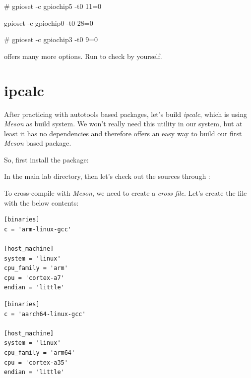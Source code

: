 \if{}
\begin{bashinput}
# gpioset -c gpiochip5 -t0 11=0
\end{bashinput}
\fi

\if{}
\begin{bashinput}
gpioset -c gpiochip0 -t0 28=0
\end{bashinput}
\fi

\if{}
\begin{bashinput}
# gpioset -c gpiochip3 -t0 9=0
\end{bashinput}
\fi

 offers many more options. Run  to
check by yourself.

\section{ipcalc}

After practicing with autotools based packages, let's build {\em ipcalc}, which
is using {\em Meson} as build system. We won't really need this utility
in our system, but at least it has no dependencies and therefore
offers an easy way to build our first {\em Meson} based package.

So, first install the  package:


In the main lab directory, then let's check out the sources through
:


To cross-compile with {\em Meson}, we need to create a {\em cross file}.
Let's create the  file with the below contents:

\if{}
\begin{verbatim}
[binaries]
c = 'arm-linux-gcc'

[host_machine]
system = 'linux'
cpu_family = 'arm'
cpu = 'cortex-a7'
endian = 'little'
\end{verbatim}
\fi

\if{}
\begin{verbatim}
[binaries]
c = 'aarch64-linux-gcc'

[host_machine]
system = 'linux'
cpu_family = 'arm64'
cpu = 'cortex-a35'
endian = 'little'
\end{verbatim}
\fi

